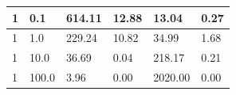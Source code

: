 \documentclass[12pt,a4paper]{report}
\begin{document}
\begin{table}[htbp]
\begin{tabular}{|l|l|l|l|l|l|}
1                                                                                               & 0.1                                                                                                                    & 614.11                                                                                                                                     & 12.88                                                                                                                             & 13.04                                                                                                 & 0.27                                                                                                                                    \\ \hline
1                                                                                               & 1.0                                                                                                                    & 229.24                                                                                                                                     & 10.82                                                                                                                             & 34.99                                                                                                 & 1.68                                                                                                                                    \\ \hline
1                                                                                               & 10.0                                                                                                                   & 36.69                                                                                                                                      & 0.04                                                                                                                              & 218.17                                                                                                & 0.21                                                                                                                                    \\ \hline
1                                                                                               & 100.0                                                                                                                  & 3.96                                                                                                                                       & 0.00                                                                                                                              & 2020.00                                                                                               & 0.00                                                                                                                                    \\ \hline

\end{tabular}
\end{table}
\end{document}
